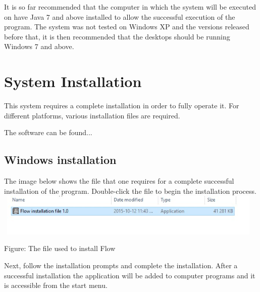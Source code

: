 \documentclass[11pt,a4paper,titlepage]{article}
\begin{document}
		It is so far recommended that the computer in which the system will be executed on have Java 7 and above installed to allow the successful execution of the program. The system was not tested on Windows XP and the versions released before that, it is then recommended that the desktops should be running Windows 7 and above.\newline		
		
\section{System Installation}
		
		This system requires a complete installation in order to fully operate it. For different platforms, various installation files are required. \newline \newline
		
		The software can be found...
		
		
		
		
		

		\subsection{Windows installation}
		
		The image below shows the file that one requires for a complete successful installation of the program. Double-click the file to begin the installation process. \newline \newline \newline
		\includegraphics[width=13cm, height=2cm]{images/Install1.jpg}		
		\begin{center}
		Figure: The file used to install Flow \newline
		\end{center}
			
		Next, follow the installation prompts and complete the installation. After a successful installation the application will be added to computer programs and it is accessible from the start menu. \\ \\
		
\end{document}
